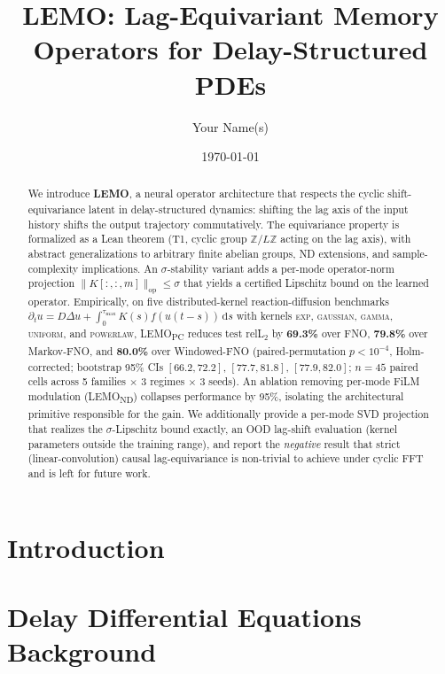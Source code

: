 \documentclass[11pt]{article}
\title{LEMO: Lag-Equivariant Memory Operators for Delay-Structured PDEs}
\author{Your Name(s)}
\date{\today}
\theoremstyle{plain}
\theoremstyle{definition}
\theoremstyle{remark}
\begin{document}
\maketitle

\begin{abstract}
We introduce \textbf{LEMO}, a neural operator architecture that respects the cyclic
shift-equivariance latent in delay-structured dynamics: shifting the lag axis of the input
history shifts the output trajectory commutatively.  The equivariance property is formalized as
a Lean theorem (T1, cyclic group $\mathbb{Z}/L\mathbb{Z}$ acting on the lag axis), with abstract
generalizations to arbitrary finite abelian groups, ND extensions, and sample-complexity
implications.  An $\sigma$-stability variant adds a per-mode operator-norm projection
$\|K[:,:,m]\|_{\mathrm{op}} \le \sigma$ that yields a certified Lipschitz bound on the learned
operator.  Empirically, on five distributed-kernel reaction-diffusion benchmarks
$\partial_t u = D\Delta u + \int_0^{\tau_{\max}} K(s) f(u(t-s))\,\mathrm{d}s$ with kernels
\textsc{exp}, \textsc{gaussian}, \textsc{gamma}, \textsc{uniform}, and \textsc{powerlaw},
LEMO\textsubscript{PC} reduces test relL$_2$ by \textbf{69.3\%} over FNO,
\textbf{79.8\%} over Markov-FNO, and \textbf{80.0\%} over Windowed-FNO
(paired-permutation $p<10^{-4}$, Holm-corrected; bootstrap 95\% CIs $[66.2, 72.2]$,
$[77.7, 81.8]$, $[77.9, 82.0]$; $n=45$ paired cells across 5 families $\times$ 3 regimes
$\times$ 3 seeds).  An ablation removing per-mode FiLM modulation (LEMO\textsubscript{ND})
collapses performance by 95\%, isolating the architectural primitive responsible for the
gain.  We additionally provide a per-mode SVD projection that realizes the $\sigma$-Lipschitz
bound exactly, an OOD lag-shift evaluation (kernel parameters outside the training range), and
report the \emph{negative} result that strict (linear-convolution) causal lag-equivariance is
non-trivial to achieve under cyclic FFT and is left for future work.
\end{abstract}

\section{Introduction}


\section{Delay Differential Equations Background}

\end{document}
